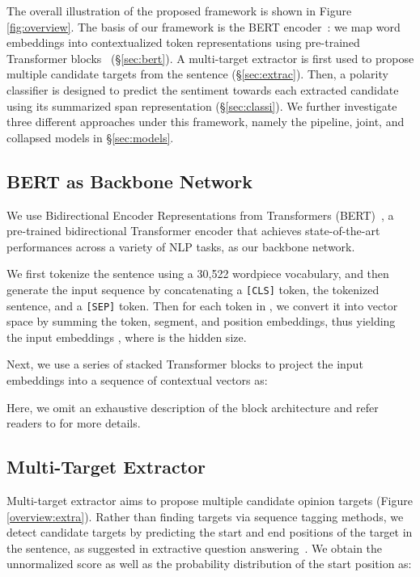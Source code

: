 \documentclass[11pt,a4paper]{article}
\begin{document}
The overall illustration of the proposed framework is shown in Figure \ref{fig:overview}. 
The basis of our framework is the BERT encoder~\cite{devlin2018bert}: we map word embeddings into contextualized token representations using pre-trained Transformer blocks~\cite{vaswani2017attention} (\S\ref{sec:bert}).
A multi-target extractor is first used to propose multiple candidate targets from the sentence (\S\ref{sec:extrac}). 
Then, a polarity classifier is designed to predict the sentiment towards each extracted candidate using its summarized span representation (\S\ref{sec:classi}).
We further investigate three different approaches under this framework, namely the pipeline, joint, and collapsed models in \S\ref{sec:models}.


\subsection{BERT as Backbone Network		\label{sec:bert}}
We use Bidirectional Encoder Representations from Transformers (BERT)~\cite{devlin2018bert}, a pre-trained bidirectional Transformer encoder that achieves state-of-the-art performances across a variety of NLP tasks, as our backbone network.

We first tokenize the sentence  using a 30,522 wordpiece vocabulary, and then generate the input sequence  by concatenating a \texttt{[CLS]} token, the tokenized sentence, and a \texttt{[SEP]} token.
Then for each token  in , we convert it into vector space by summing the token, segment, and position embeddings, thus yielding the input embeddings , where  is the hidden size.

Next, we use a series of  stacked Transformer blocks to project the input embeddings into a sequence of contextual vectors  as:

Here, we omit an exhaustive description of the block architecture and refer readers to \citet{vaswani2017attention} for more details.

\subsection{Multi-Target Extractor		\label{sec:extrac}}
Multi-target extractor aims to propose multiple candidate opinion targets (Figure \ref{overview:extra}).
Rather than finding targets via sequence tagging methods, we detect candidate targets by predicting the start and end positions of the target in the sentence, as suggested in extractive question answering~\cite{wang2016machine,seo2016bidirectional,hu2017reinforced}.
We obtain the unnormalized score as well as the probability distribution of the start position as:
\end{document}
